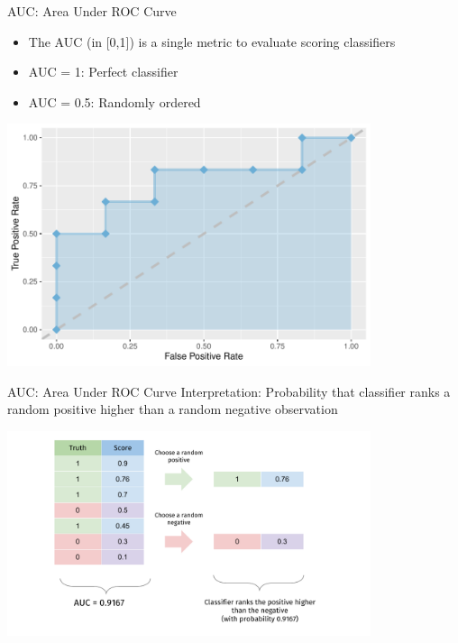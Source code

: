 \documentclass[11pt,compress,t,notes=noshow, xcolor=table]{beamer}
\newenvironment{knitrout}{}{} %
\begin{document}
\begin{vbframe}{AUC: Area Under ROC Curve}

\begin{itemize}
  \item The AUC (in [0,1]) is a single metric to evaluate scoring classifiers
  \item AUC = 1: Perfect classifier
  \item AUC = 0.5: Randomly ordered
\end{itemize}
\begin{knitrout}\scriptsize
{}\color{fgcolor}

{\centering \includegraphics[width=0.8\textwidth]{figure/eval_mclass_roc_sp_12_1}

}



\end{knitrout}
\end{vbframe}


\begin{vbframe}{AUC: Area Under ROC Curve}
Interpretation: Probability that classifier ranks a random positive higher than a random negative observation

\begin{center}
\includegraphics[width=0.8\textwidth,page=1]{figure_man/auc_interpretation.pdf}
\end{center}

\end{vbframe}
\end{document}
